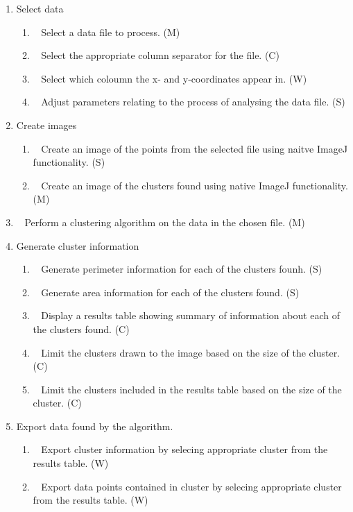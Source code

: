 \begin{enumerate}[label=\arabic*.]
	\item Select data
		\begin{enumerate}[label*=\arabic*.]
			\item~\label{req:a} Select a data file to process. (M)
			\item~\label{req:b} Select the appropriate column separator for the
				file. (C)
			\item~\label{req:c} Select which coloumn the x- and y-coordinates
				appear in. (W)
			\item~\label{req:d} Adjust parameters relating to the process of
				analysing the data file. (S)
		\end{enumerate}
	\item Create images
		\begin{enumerate}[label*=\arabic*.]
			\item~\label{req:e} Create an image of the points from the selected
				file using naitve ImageJ functionality. (S)
			\item~\label{req:f} Create an image of the clusters found using
				native ImageJ functionality. (M)
		\end{enumerate}
	\item~\label{req:g} Perform a clustering algorithm on the data in the
		chosen file. (M)
	\item Generate cluster information
		\begin{enumerate}[label*=\arabic*.]
			\item~\label{req:h} Generate perimeter information for each of the
				clusters founh. (S)
			\item~\label{req:i} Generate area information for each of the
				clusters found. (S)
			\item~\label{req:j} Display a results table showing summary of
				information about each of the clusters found. (C)
			\item~\label{req:k} Limit the clusters drawn to the image based on
				the size of the cluster. (C)
			\item~\label{req:l} Limit the clusters included in the results
				table based on the size of the cluster. (C)
		\end{enumerate}
	\item Export data found by the algorithm.
		\begin{enumerate}[label*=\arabic*.]
			\item~\label{req:m} Export cluster information by selecing
				appropriate cluster from the results table. (W)
			\item~\label{req:n} Export data points contained in cluster by
				selecing appropriate cluster from the results table. (W)
		\end{enumerate}
\end{enumerate}

